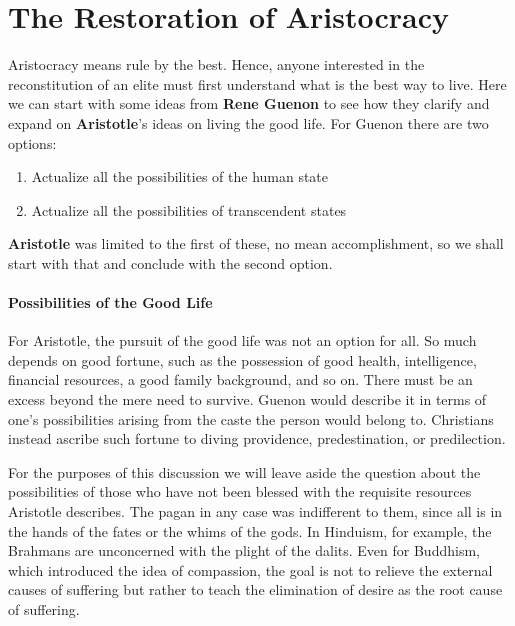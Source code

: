 \section{The Restoration of Aristocracy}

Aristocracy means rule by the best. Hence, anyone interested in the reconstitution of an elite must first understand what is the best way to live. Here we can start with some ideas from \textbf{Rene Guenon} to see how they clarify and expand on \textbf{Aristotle}'s ideas on living the good life. For Guenon there are two options:

\begin{enumerate}


\item Actualize all the possibilities of the human state

\item Actualize all the possibilities of transcendent states
\end{enumerate}


\textbf{Aristotle} was limited to the first of these, no mean accomplishment, so we shall start with that and conclude with the second option.

\paragraph{Possibilities of the Good Life}


For Aristotle, the pursuit of the good life was not an option for all. So much depends on good fortune, such as the possession of good health, intelligence, financial resources, a good family background, and so on. There must be an excess beyond the mere need to survive. Guenon would describe it in terms of one's possibilities arising from the caste the person would belong to. Christians instead ascribe such fortune to diving providence, predestination, or predilection.

For the purposes of this discussion we will leave aside the question about the possibilities of those who have not been blessed with the requisite resources Aristotle describes. The pagan in any case was indifferent to them, since all is in the hands of the fates or the whims of the gods. In Hinduism, for example, the Brahmans are unconcerned with the plight of the dalits. Even for Buddhism, which introduced the idea of compassion, the goal is not to relieve the external causes of suffering but rather to teach the elimination of desire as the root cause of suffering.

